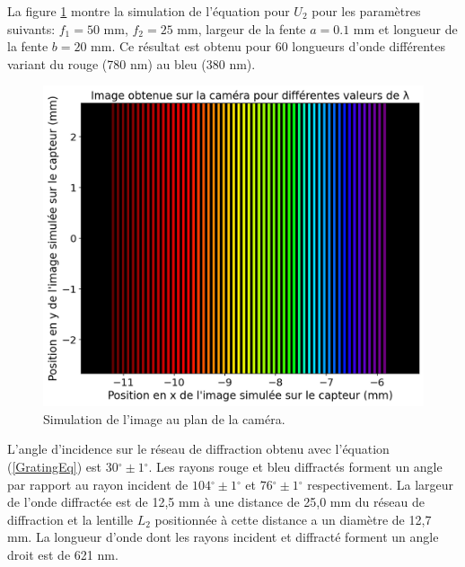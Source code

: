\documentclass[conference]{IEEEtran}
\begin{document}
 La figure \ref{arc-en-ciel} montre la simulation de l'équation pour $U_2$ pour les paramètres suivants: 
 $f_1=50$ mm, $f_2=25$ mm, largeur de la fente $a=0.1$ mm et longueur de la fente $b=20$ mm. Ce résultat est obtenu pour
 60 longueurs d'onde différentes variant du rouge (780 nm) au bleu (380 nm). 
 \begin{figure}[H]
    \centering
    \includegraphics[scale=0.4]{simu2.png}
    \caption{Simulation de l'image au plan de la caméra.}
    \label{arc-en-ciel}
\end{figure}

L'angle d'incidence sur le réseau de diffraction obtenu avec l'équation (\ref{GratingEq})
est $30{^\circ}\pm 1{^\circ}$. Les rayons rouge et bleu diffractés forment un angle par rapport
au rayon incident de $104{^\circ}\pm 1{^\circ}$ et $76{^\circ}\pm 1{^\circ}$ respectivement. La largeur de l'onde
diffractée est de 12,5 mm à une distance de 25,0 mm du réseau de diffraction et la lentille $L_2$
positionnée à cette distance a un diamètre de 12,7 mm. 
La longueur d'onde dont les rayons incident et diffracté forment un angle droit est de 621 nm.
\end{document}
